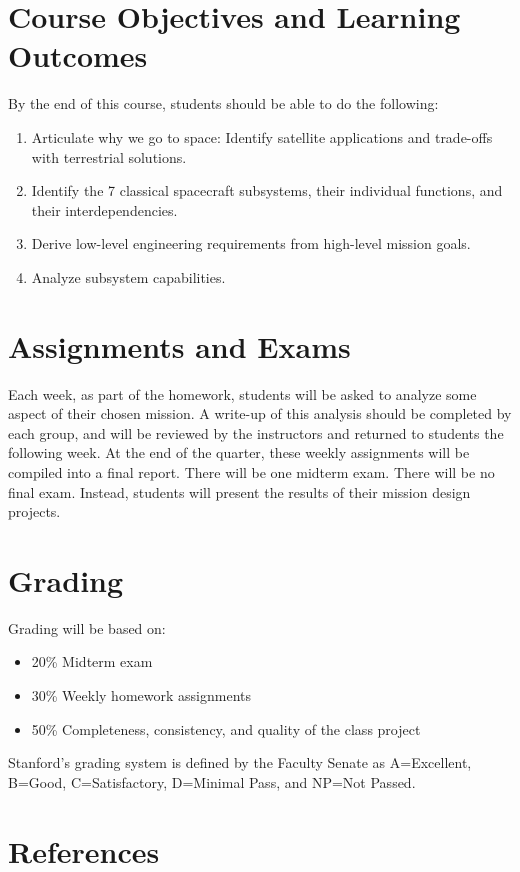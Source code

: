 \documentclass[11pt,letterpaper]{article}
\begin{document}
\section*{Course Objectives and Learning Outcomes}
By the end of this course, students should be able to do the following:
\begin{enumerate}
	\item Articulate why we go to space: Identify satellite applications and trade-offs with terrestrial solutions.
	\item Identify the 7 classical spacecraft subsystems, their individual functions, and their interdependencies.
	\item Derive low-level engineering requirements from high-level mission goals.
	\item Analyze subsystem capabilities.
\end{enumerate}

\section*{Assignments and Exams}

Each week, as part of the homework, students will be asked to analyze some aspect of their chosen mission. A write-up of this analysis should be completed by each group, and will be reviewed by the instructors and returned to students the following week. At the end of the quarter, these weekly assignments will be compiled into a final report. There will be one midterm exam. There will be no final exam. Instead, students will present the results of their mission design projects.

\section*{Grading}

Grading will be based on:
\begin{itemize}
	\item 20\% Midterm exam
	\item 30\% Weekly homework assignments
	\item 50\% Completeness, consistency, and quality of the class project
\end{itemize}
Stanford's grading system is defined by the Faculty Senate as A=Excellent, B=Good, C=Satisfactory, D=Minimal Pass, and NP=Not Passed.

\section*{References}
\end{document}

